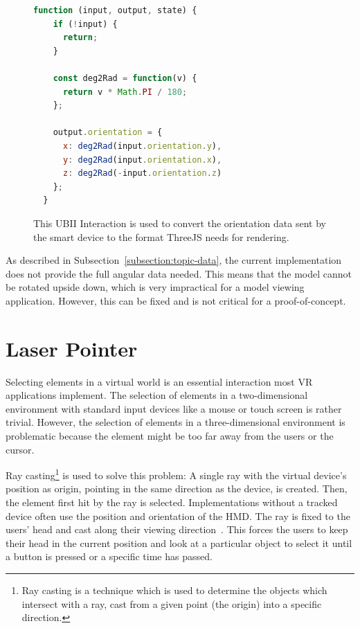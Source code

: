 \begin{figure}[H]
	\begin{lstlisting}[language=JavaScript]
  function (input, output, state) {
    if (!input) {
      return;
    }

    const deg2Rad = function(v) {
      return v * Math.PI / 180;
    };

    output.orientation = {
      x: deg2Rad(input.orientation.y),
      y: deg2Rad(input.orientation.x),
      z: deg2Rad(-input.orientation.z)
    };
  }
 \end{lstlisting}
  \caption[A UBII Interaction of model viewer]{This \gls{UBII} Interaction is used to convert the orientation data sent by the smart device to the format ThreeJS needs for rendering.}\label{fig:ubii-interaction-angles} %
\end{figure}

As described in Subsection~\ref{subsection:topic-data}, the current implementation does not provide the full angular data needed. This means that the model cannot be rotated upside down, which is very impractical for a model viewing application. However, this can be fixed and is not critical for a proof-of-concept.


\section{Laser Pointer}\label{section:laser-pointer}

Selecting elements in a virtual world is an essential interaction most \gls{VR} applications implement. The selection of elements in a two-dimensional environment with standard input devices like a mouse or touch screen is rather trivial. However, the selection of elements in a three-dimensional environment is problematic because the element might be too far away from the users or the cursor.

Ray casting\footnote{Ray casting is a technique which is used to determine the objects which intersect with a ray, cast from a given point (the origin) into a specific direction.} is used to solve this problem: A single ray with the virtual device's position as origin, pointing in the same direction as the device, is created. Then, the element first hit by the ray is selected. Implementations without a tracked device often use the position and orientation of the \gls{HMD}. The ray is fixed to the users' head and cast along their viewing direction~\cite[23]{Kamm.2018}. This forces the users to keep their head in the current position and look at a particular object to select it until a button is pressed or a specific time has passed.

